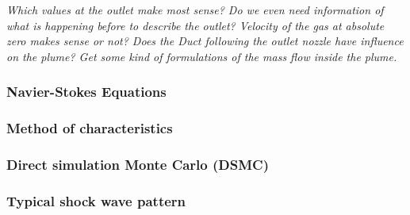 {\color{greenColor}\itshape
Which values at the outlet make most sense?
Do we even need information of what is happening before to describe the outlet?
Velocity of the gas at absolute zero makes sense or not?
Does the Duct following the outlet nozzle have influence on the plume?
Get some kind of formulations of the mass flow inside the plume.
}
\subsubsection*{Navier-Stokes Equations}

\subsubsection*{Method of characteristics}

\subsubsection*{Direct simulation Monte Carlo (DSMC)}

\subsubsection*{Typical shock wave pattern}

\cite{putignano2012supersonic}
\cite{liu_study_2006}
\cite{robertson_investigation_1970}
